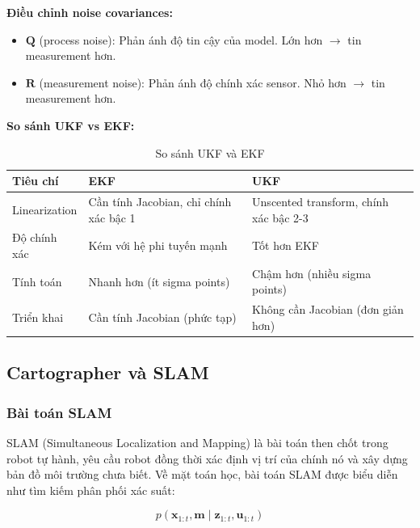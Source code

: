 \textbf{Điều chỉnh noise covariances:}
\begin{itemize}
\item $\mathbf{Q}$ (process noise): Phản ánh độ tin cậy của model. Lớn hơn $\rightarrow$ tin measurement hơn.
\item $\mathbf{R}$ (measurement noise): Phản ánh độ chính xác sensor. Nhỏ hơn $\rightarrow$ tin measurement hơn.
\end{itemize}

\textbf{So sánh UKF vs EKF:}

\begin{table}[ht]
\centering
\caption{So sánh UKF và EKF}
\label{tab:ukf_vs_ekf}
\begin{tabular}{|p{3cm}|p{5.5cm}|p{5.5cm}|}
\hline
\textbf{Tiêu chí} & \textbf{EKF} & \textbf{UKF} \\
\hline
Linearization & Cần tính Jacobian, chỉ chính xác bậc 1 & Unscented transform, chính xác bậc 2-3 \\
\hline
Độ chính xác & Kém với hệ phi tuyến mạnh & Tốt hơn EKF \\
\hline
Tính toán & Nhanh hơn (ít sigma points) & Chậm hơn (nhiều sigma points) \\
\hline
Triển khai & Cần tính Jacobian (phức tạp) & Không cần Jacobian (đơn giản hơn) \\
\hline
\end{tabular}
\end{table}

\subsection{Cartographer và SLAM}
\label{subsec:cartographer_slam}

\subsubsection{Bài toán SLAM}

SLAM (Simultaneous Localization and Mapping) \cite{thrun2005probabilistic} là bài toán then chốt trong robot tự hành, yêu cầu robot đồng thời xác định vị trí của chính nó và xây dựng bản đồ môi trường chưa biết. Về mặt toán học, bài toán SLAM được biểu diễn như tìm kiếm phân phối xác suất:

\begin{equation}
p(\mathbf{x}_{1:t}, \mathbf{m} \mid \mathbf{z}_{1:t}, \mathbf{u}_{1:t})
\label{eq:slam_problem}
\end{equation}

